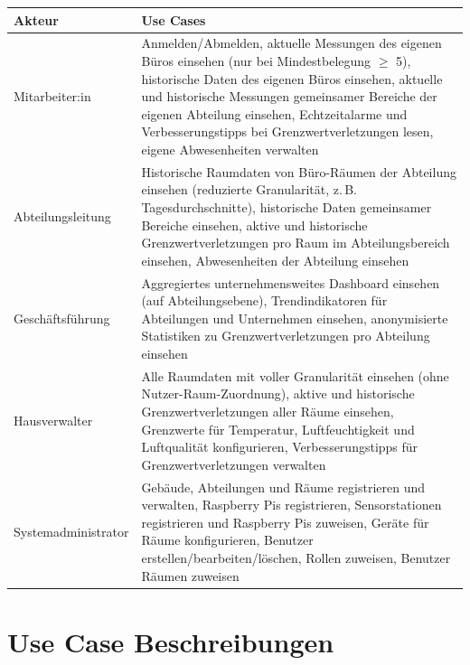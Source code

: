 \documentclass[12pt,a4paper]{article}
\begin{document}
\begin{center}
	\begin{tabularx}{\textwidth}{lX}
		\toprule
		\textbf{Akteur} & \textbf{Use Cases} \\
		\midrule
		Mitarbeiter:in & Anmelden/Abmelden, aktuelle Messungen des eigenen Büros einsehen (nur bei Mindestbelegung $\geq$ 5), historische Daten des eigenen Büros einsehen, aktuelle und historische Messungen gemeinsamer Bereiche der eigenen Abteilung einsehen, Echtzeitalarme und Verbesserungstipps bei Grenzwertverletzungen lesen, eigene Abwesenheiten verwalten \\
		Abteilungsleitung & Historische Raumdaten von Büro-Räumen der Abteilung einsehen (reduzierte Granularität, z.\,B. Tagesdurchschnitte), historische Daten gemeinsamer Bereiche einsehen, aktive und historische Grenzwertverletzungen pro Raum im Abteilungsbereich einsehen, Abwesenheiten der Abteilung einsehen \\
		Geschäftsführung & Aggregiertes unternehmensweites Dashboard einsehen (auf Abteilungsebene), Trendindikatoren für Abteilungen und Unternehmen einsehen, anonymisierte Statistiken zu Grenzwertverletzungen pro Abteilung einsehen \\
		Hausverwalter & Alle Raumdaten mit voller Granularität einsehen (ohne Nutzer-Raum-Zuordnung), aktive und historische Grenzwertverletzungen aller Räume einsehen, Grenzwerte für Temperatur, Luftfeuchtigkeit und Luftqualität konfigurieren, Verbesserungstipps für Grenzwertverletzungen verwalten \\
		Systemadministrator & Gebäude, Abteilungen und Räume registrieren und verwalten, Raspberry Pis registrieren, Sensorstationen registrieren und Raspberry Pis zuweisen, Geräte für Räume konfigurieren, Benutzer erstellen/bearbeiten/löschen, Rollen zuweisen, Benutzer Räumen zuweisen \\
		\bottomrule
	\end{tabularx}
\end{center}

\section{Use Case Beschreibungen}
\end{document}
